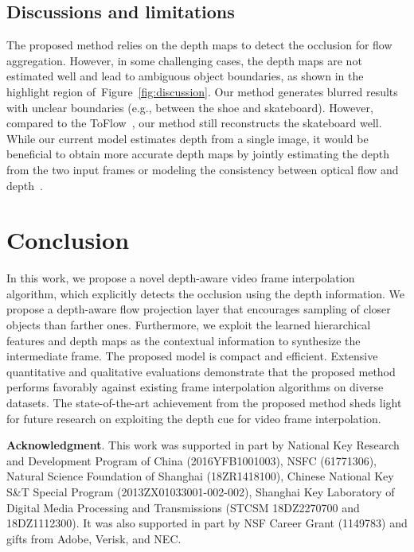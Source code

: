 \documentclass[10pt,twocolumn,letterpaper]{article}
\newcommand{\Paragraph}[1]{{\vspace{-2mm}\flushleft\textbf{#1}}} \newcommand{\ul}[1]{\underline{\smash{#1}}}
\newcommand{\figref}[1]{Figure~\ref{fig:#1}}
\begin{document}
	\subsection{Discussions and limitations}
The proposed method relies on the depth maps to detect the occlusion for flow aggregation.
However, in some challenging cases, the depth maps are not estimated well and lead to ambiguous object boundaries, as shown in the highlight region of~\figref{discussion}.
Our method generates blurred results with unclear boundaries (e.g., between the shoe and skateboard).
However, compared to the ToFlow~\cite{xue2017video}, our method still reconstructs the skateboard well.
While our current model estimates depth from a single image, it would be beneficial to obtain more accurate depth maps by jointly estimating the depth from the two input frames or modeling the consistency between optical flow and depth~\cite{zou2018df}.


	
	
	
	\section{Conclusion}
In this work, we propose a novel depth-aware video frame interpolation algorithm, which explicitly detects the occlusion using the depth information.
We propose a depth-aware flow projection layer that encourages sampling of closer objects than farther ones.
Furthermore, we exploit the learned hierarchical features and depth maps as the contextual information to synthesize the intermediate frame.
The proposed model is compact and efficient.
Extensive quantitative and qualitative evaluations demonstrate that the proposed method performs favorably against existing frame interpolation algorithms on diverse datasets.
The state-of-the-art achievement from the proposed method sheds light for future research on exploiting the depth cue for video frame interpolation.
	
	
\small{
	\Paragraph{Acknowledgment}. 
	This work was supported in part by National Key Research and Development Program of China (2016YFB1001003), NSFC (61771306), Natural Science Foundation of Shanghai (18ZR1418100), Chinese National Key S\&T Special Program (2013ZX01033001-002-002), Shanghai Key Laboratory of Digital Media Processing and Transmissions (STCSM 18DZ2270700 and 18DZ1112300). It was also supported in part by NSF Career Grant (1149783) and gifts from Adobe, Verisk, and NEC.
}
	
	
	\newpage
	{\small
		
		
	}
	
\end{document}
